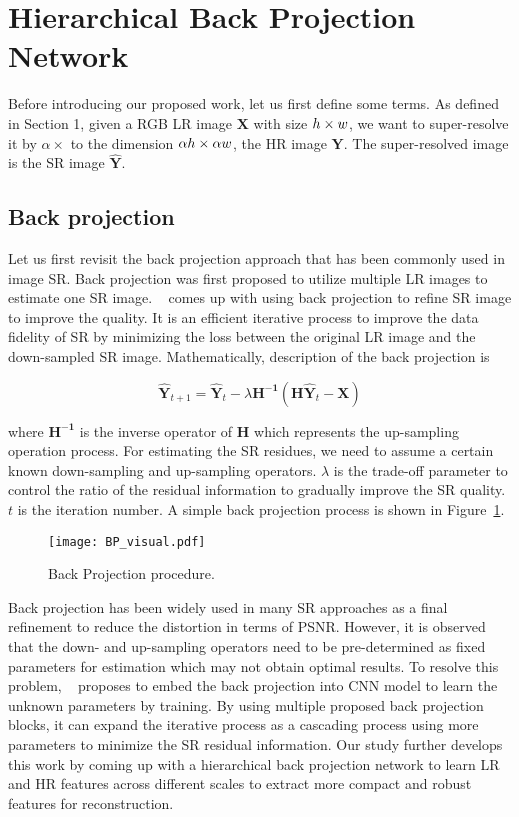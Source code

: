 \documentclass[10pt,twocolumn,letterpaper]{article}
\begin{document}
\section{Hierarchical Back Projection Network}
Before introducing our proposed work, let us first define some terms. As defined in Section 1, given a RGB LR image $\mathbf{X}$ with size $h\times w\time 3$, we want to super-resolve it by $\alpha\times$ to the dimension $\alpha h\times \alpha w\time 3$, the HR image $\mathbf{Y}$. The super-resolved image is the SR image $\mathbf{\hat{Y}}$.

\subsection{Back projection}

Let us first revisit the back projection approach that has been commonly used in image SR. Back projection was first proposed to utilize multiple LR images to estimate one SR image. ~\cite{DBPN} comes up with using back projection to refine SR image to improve the quality. It is an efficient iterative process to improve the data fidelity of SR by minimizing the loss between the original LR image and the down-sampled SR image. Mathematically, description of the back projection is
\begin{small}
\begin{equation}
\mathbf{\hat{Y}}_{\mathit{t}+1}=\mathbf{\hat{Y}}_{\mathit{t}}-\lambda\mathbf{H^{-1}}(\mathbf{H}\mathbf{\hat{Y}}_{\mathit{t}}-\mathbf{X}) \tag{3}
\label{Equation 3}
\end{equation}
\end{small}
where $\mathbf{H^{-1}}$ is the inverse operator of $\mathbf{H}$ which represents the up-sampling operation process. For estimating the SR residues, we need to assume a certain known down-sampling and up-sampling operators. $\lambda$ is the trade-off parameter to control the ratio of the residual information to gradually improve the SR quality. $\mathit{t}$ is the iteration number. A simple back projection process is shown in Figure~\ref{Figure 2}.
\begin{figure}[t]
\vskip 0.01in
\begin{center}
\centerline{\texttt{[image: BP\_visual.pdf]}}
\caption{Back Projection procedure.}
\label{Figure 2}
\end{center}
\vskip -0.3in
\end{figure}
Back projection has been widely used in many SR approaches as a final refinement to reduce the distortion in terms of PSNR. However, it is observed that the down- and up-sampling operators need to be pre-determined as fixed parameters for estimation which may not obtain optimal results. To resolve this problem, ~\cite{DBPN} proposes to embed the back projection into CNN model to learn the unknown parameters by training. By using multiple proposed back projection blocks, it can expand the iterative process as a cascading process using more parameters to minimize the SR residual information. Our study further develops this work by coming up with a hierarchical back projection network to learn LR and HR features across different scales to extract more compact and robust features for reconstruction.
\end{document}
